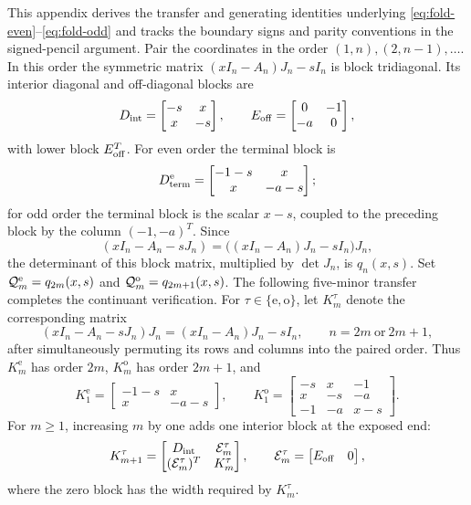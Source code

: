 \documentclass[11pt,a4paper]{article}
\numberwithin{equation}{section}
\begin{document}
This appendix derives the transfer and generating identities underlying
\eqref{eq:fold-even}--\eqref{eq:fold-odd} and tracks the boundary signs and
parity conventions in the signed-pencil argument.
Pair the coordinates in the order
\((1,n),(2,n-1),\ldots\).  In this order the symmetric matrix
\((xI_n-A_n)J_n-sI_n\) is block tridiagonal.  Its interior diagonal and
off-diagonal blocks are
\[
 D_{\rm int}=\begin{bmatrix}-s&x\\x&-s\end{bmatrix},
 \qquad
 E_{\rm off}=\begin{bmatrix}0&-1\\-a&0\end{bmatrix},
\]
with lower block \(E_{\rm off}^T\).  For even order the terminal block is
\[
 D_{\rm term}^{\rm e}=\begin{bmatrix}-1-s&x\\x&-a-s\end{bmatrix};
\]
for odd order the terminal block is the scalar \(x-s\), coupled to the
preceding block by the column \((-1,-a)^T\).  Since
\[
 (xI_n-A_n-sJ_n)=\bigl((xI_n-A_n)J_n-sI_n\bigr)J_n,
\]
the determinant of this block matrix, multiplied by \(\det J_n\), is
\(q_n(x,s)\).  Set \(\mathcal Q_m^{\rm e}=q_{2m}(x,s)\) and
\(\mathcal Q_m^{\rm o}=q_{2m+1}(x,s)\).  The following five-minor transfer
completes the continuant verification.
For \(\tau\in\{\mathrm e,\mathrm o\}\), let \(K_m^\tau\) denote the
corresponding matrix
\[
 (xI_n-A_n-sJ_n)J_n=(xI_n-A_n)J_n-sI_n,
 \qquad n=2m\ \text{or}\ 2m+1,
\]
after simultaneously permuting its rows and columns into the paired
order.  Thus \(K_m^{\mathrm e}\) has order \(2m\),
\(K_m^{\mathrm o}\) has order \(2m+1\), and
\[
 K_1^{\mathrm e}=
 \begin{bmatrix}-1-s&x\\x&-a-s\end{bmatrix},
 \qquad
 K_1^{\mathrm o}=
 \begin{bmatrix}
 -s&x&-1\\
 x&-s&-a\\
 -1&-a&x-s
 \end{bmatrix}.
\]
For \(m\geq1\), increasing \(m\) by one adds one interior block at the
exposed end:
\begin{equation}\label{eq:fold-block-extension}
 K_{m+1}^\tau=
 \begin{bmatrix}
  D_{\rm int}&\mathcal E_m^\tau\\
  (\mathcal E_m^\tau)^T&K_m^\tau
 \end{bmatrix},
 \qquad
 \mathcal E_m^\tau=
 \begin{bmatrix}E_{\rm off}&0\end{bmatrix},
\end{equation}
where the zero block has the width required by \(K_m^\tau\).
\end{document}
